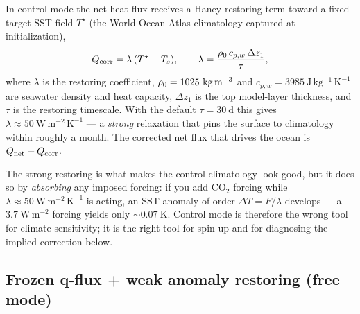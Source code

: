 In control mode the net heat flux receives a Haney restoring term \citep{haney1971} toward a fixed
target SST field $T^{\star}$ (the World Ocean Atlas climatology captured at
initialization),
\begin{equation}
  Q_{\mathrm{corr}} = \lambda\,(T^{\star} - T_s),
  \qquad
  \lambda = \frac{\rho_0\,c_{p,w}\,\Delta z_1}{\tau},
  \label{eq:haney}
\end{equation}
where $\lambda$ is the restoring coefficient, $\densz=1025\ \mathrm{kg\,m^{-3}}$
and $c_{p,w}=3985\ \mathrm{J\,kg^{-1}\,K^{-1}}$ are seawater density and heat
capacity, $\Delta z_1$ is the top model-layer thickness, and $\tau$ is the
restoring timescale. With the default $\tau=30\ \mathrm{d}$ this gives
$\lambda\approx50\ \mathrm{W\,m^{-2}\,K^{-1}}$ --- a \emph{strong} relaxation that
pins the surface to climatology within roughly a month. The corrected net flux
that drives the ocean is $Q_{\mathrm{net}} + Q_{\mathrm{corr}}$.

\begin{remark}
The strong restoring is what makes the control climatology look good, but it does
so by \emph{absorbing} any imposed forcing: if you add CO$_2$ forcing while
$\lambda\approx50\ \mathrm{W\,m^{-2}\,K^{-1}}$ is acting, an SST anomaly of order
$\Delta T = F/\lambda$ develops --- a $3.7\ \mathrm{W\,m^{-2}}$ forcing yields only
$\sim\!0.07\ \mathrm{K}$. Control mode is therefore the wrong tool for climate
sensitivity; it is the right tool for spin-up and for diagnosing the implied
correction below.
\end{remark}

\subsection{Frozen q-flux + weak anomaly restoring (free mode)}

